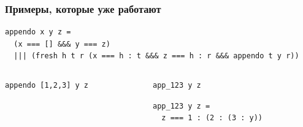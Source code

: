 \documentclass{beamer}
\begin{document}
\begin{frame}[fragile,t]
  \transwipe[direction=90]
  \frametitle{Примеры, которые уже работают}
\begin{center}
\begin{minipage}[c]{9.5cm}
\begin{lstlisting}[frame=single]  
appendo x y z = 
  (x === [] &&& y === z)
  ||| (fresh h t r (x === h : t &&& z === h : r &&& appendo t y r))
\end{lstlisting}
\end{minipage}
\end{center}

\begin{columns}[t]
\begin{column}{4.3cm}
\begin{badcode}
\begin{lstlisting}[frame=single]  
appendo [1,2,3] y z
\end{lstlisting}
\end{badcode}
\end{column}

\pause

\begin{column}{4.8cm}
\begin{goodcode}
\begin{lstlisting}[frame=single]  
app_123 y z 
\end{lstlisting}

\begin{lstlisting}[frame=single]  
app_123 y z = 
  z === 1 : (2 : (3 : y))
\end{lstlisting}
\end{goodcode}
\end{column}
\end{columns}
\end{frame}
\end{document}
